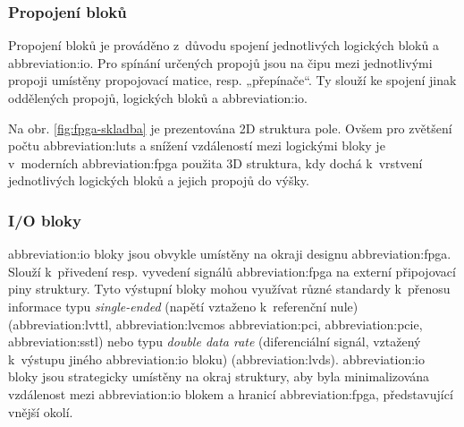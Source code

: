 \documentclass[a4paper, twoside, 11pt]{article}
\begin{document}
		\subsubsection{Propojení bloků}
			Propojení bloků je prováděno z~důvodu spojení jednotlivých logických bloků a \gls{abbreviation:io}. Pro spínání určených propojů jsou na čipu mezi jednotlivými propoji umístěny propojovací matice, resp. „přepínače“. Ty slouží ke spojení jinak oddělených propojů, logických bloků a \gls{abbreviation:io}. \cite{Sass2010}\par
			Na obr. \ref{fig:fpga-skladba} je prezentována 2D struktura pole. Ovšem pro zvětšení počtu \gls{abbreviation:luts} a snížení vzdáleností mezi logickými bloky je v~moderních \gls{abbreviation:fpga} použita 3D struktura, kdy dochá k~vrstvení jednotlivých logických bloků a jejich propojů do výšky. \cite{pang-beginning-fpga}

		\subsubsection{I/O bloky}
		\gls{abbreviation:io} bloky jsou obvykle umístěny na okraji designu \gls{abbreviation:fpga}. Slouží k~přivedení resp. vyvedení signálů \gls{abbreviation:fpga} na externí připojovací piny struktury. Tyto výstupní bloky mohou využívat různé standardy k~přenosu informace typu \textit{single-ended} (napětí vztaženo k~referenční nule) (\gls{abbreviation:lvttl}, \gls{abbreviation:lvcmos} \gls{abbreviation:pci}, \gls{abbreviation:pcie}, \gls{abbreviation:sstl}) nebo typu \textit{double data rate} (diferenciální signál, vztažený k~výstupu jiného \gls{abbreviation:io} bloku) (\gls{abbreviation:lvds}). \gls{abbreviation:io} bloky jsou strategicky umístěny na okraj struktury, aby byla minimalizována vzdálenost mezi \gls{abbreviation:io} blokem a hranicí \gls{abbreviation:fpga}, představující vnější okolí. \cite{Sass2010} \cite{pang-beginning-fpga}
\end{document}
